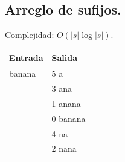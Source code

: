 \documentclass[11pt, letterpaper, twoside]{article}
\begin{document}
\subsection{Arreglo de sufijos.}

Complejidad: $O(|s|\log |s|)$.



\begin{tabular}{|p{7cm}|p{7cm}|}
\hline
\textbf{Entrada} & \textbf{Salida}\\ \hline
banana & 5 a\\
& 3 ana\\
& 1 anana\\
& 0 banana\\
& 4 na\\
& 2 nana\\ \hline
\end{tabular}

\newpage
\end{document}
